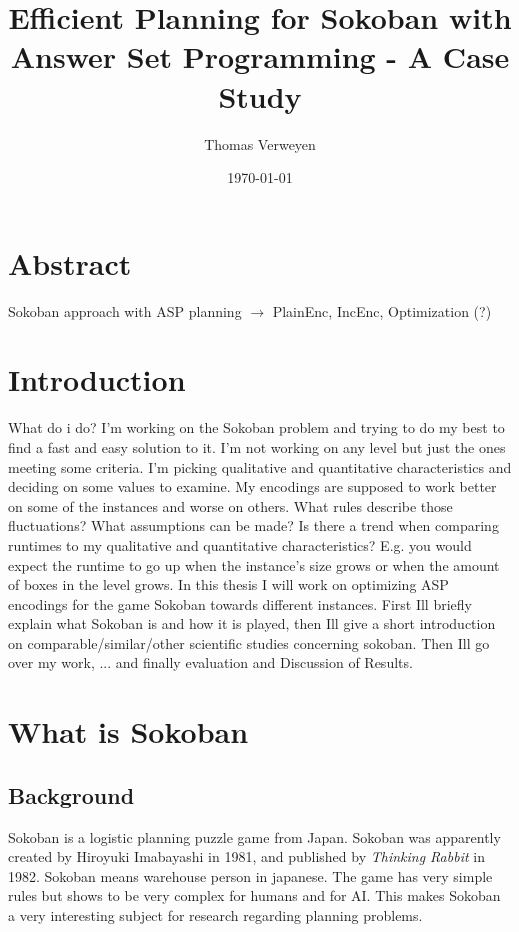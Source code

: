 \documentclass{article}
\title{Efficient Planning for Sokoban with Answer Set Programming - A Case Study}
\author{Thomas Verweyen}
\date{\today}
\begin{document}
\maketitle
\renewcommand*\contentsname{Summary}
\tableofcontents
\section*{Abstract}
Sokoban approach with ASP planning $\rightarrow$ PlainEnc, IncEnc, Optimization (?)
\section{Introduction}
What do i do? I'm working on the Sokoban problem and trying to do my best to find a fast and easy solution to it. I'm not working on any level but just the ones meeting some criteria. I'm picking qualitative and quantitative characteristics and deciding on some values to examine. My encodings are supposed to work better on some of the instances and worse on others. What rules describe those fluctuations? What assumptions can be made? Is there a trend when comparing runtimes to my qualitative and quantitative characteristics? E.g. you would expect the runtime to go up when the instance's size grows or when the amount of boxes in the level grows.
In this thesis I will work on optimizing ASP encodings for the game Sokoban towards different instances. First Ill briefly explain what Sokoban is and how it is played, then Ill give a short introduction on comparable/similar/other scientific studies concerning sokoban. Then Ill go over my work, ... and finally evaluation and Discussion of Results.
\section{What is Sokoban}
\subsection{Background}
Sokoban is a logistic planning puzzle game from Japan. Sokoban was apparently created by Hiroyuki Imabayashi in 1981, and published by \textit{Thinking Rabbit} in 1982. Sokoban means warehouse person in japanese. The game has very simple rules but shows to be very complex for humans and for AI. This makes Sokoban a very interesting subject for research regarding planning problems.
\end{document}
